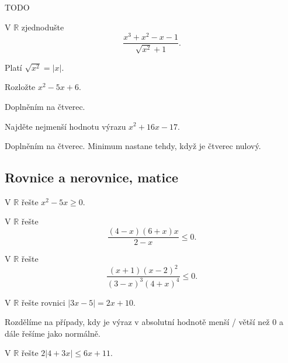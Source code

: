 \begin{reseni}
 TODO
\end{reseni}

\begin{priklad}
V $\mathbb R$ zjednodušte
$$\frac{x^3+x^2-x-1}{\sqrt{x^2}+1 }.$$
\end{priklad}

\begin{reseni}
Platí $\sqrt{x^2}=|x| $.
\end{reseni}

\begin{priklad}
Rozložte $x^2-5x+6$.
\end{priklad}

\begin{reseni}
Doplněním na čtverec.
\end{reseni}

\begin{priklad}
Najděte nejmenší hodnotu výrazu $x^2+16x-17.$
\end{priklad}

\begin{reseni}
Doplněním na čtverec. Minimum nastane tehdy, když je čtverec nulový.
\end{reseni}


\subsection{Rovnice a nerovnice, matice}
\begin{priklad}
    V $\mathbb R$ řešte $x^2-5x \geq 0.$
\end{priklad}

\begin{priklad}
V $\mathbb R$ řešte
$$\frac{(4-x)(6+x)x}{2-x}\leq 0.$$
\end{priklad}

\begin{priklad}
V $\mathbb R$ řešte $$\frac{(x+1)(x-2)^2}{(3-x)^3(4+x)^4}\leq 0.$$
\end{priklad}

\begin{priklad}
V $\mathbb R$ řešte rovnici $|3x-5|=2x+10.$
\end{priklad}

\begin{reseni}
Rozdělíme na případy, kdy je výraz v absolutní hodnotě menší / větší než 0
a dále řešíme jako normálně.
\end{reseni}

\begin{priklad}
V $\mathbb R$ řešte $2|4+3x|\leq 6x+11.$
\end{priklad}

